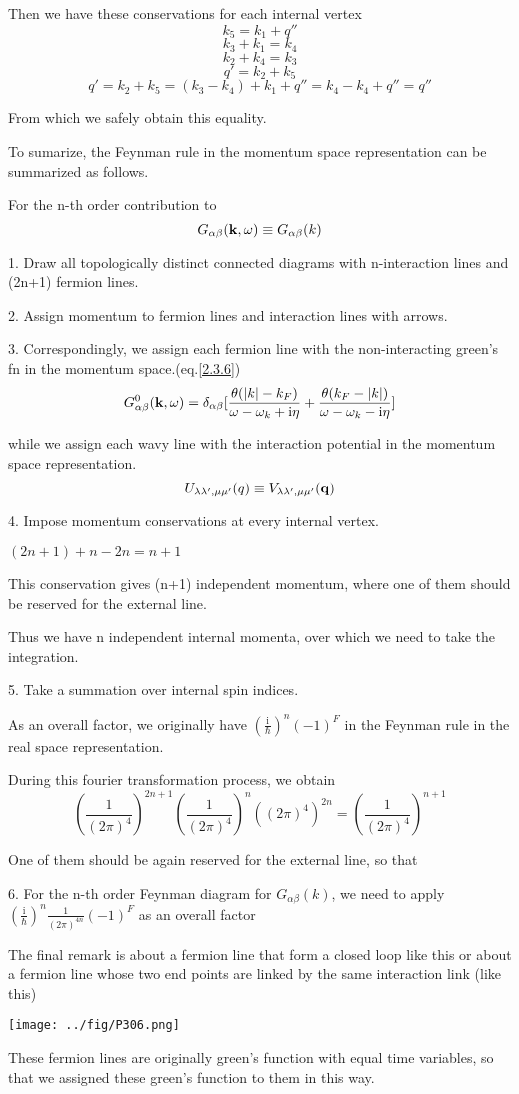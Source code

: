 Then we have these conservations for each internal vertex
$$k_5=k_1+q''$$$$k_3+k_1=k_4$$$$k_2+k_4=k_3$$$$q'=k_2+k_5$$$$q'=k_2+k_5=(k_3-k_4)+k_1+q''=k_4-k_4+q''=q''$$

From which  we safely obtain this equality.

To sumarize, the Feynman rule in the momentum space representation can be summarized as follows.

For the n-th order contribution to $$G_{\alpha\beta}({\bf k},\omega)\equiv G_{\alpha\beta}(k)$$

1. Draw all topologically distinct connected diagrams with n-interaction lines and (2n+1) fermion lines.

2. Assign momentum to fermion lines and interaction lines with arrows.

3. Correspondingly, we assign each fermion line with the non-interacting green's fn in the momentum space.(eq.\eqref{2.3.6})
$$G_{\alpha\beta}^0({\bf k},\omega)=\delta_{\alpha\beta}[\frac{\theta(|k|-k_F)}{\omega-\omega_k+\mathrm{i}\eta}+\frac{\theta(k_F-|k|)}{\omega-\omega_k-\mathrm{i}\eta}]$$

while we assign each wavy line with the interaction potential in the momentum space representation.
$$U_{\lambda\lambda',\mu\mu'}(q)\equiv V_{\lambda\lambda',\mu\mu'}({\bf q})$$

4. Impose momentum conservations at every internal vertex.

$(2n+1)+n-2n=n+1$

This conservation gives (n+1) independent momentum, where one of them should be reserved for the external line.

Thus we have n independent internal momenta, over which we need to take the integration.

5. Take a summation over internal spin indices.

As an overall factor, we originally have $(\frac{\mathrm{i}}{\hbar})^n(-1)^F$ in the Feynman rule in the real space representation.

During this fourier transformation process, we obtain
$$(\frac{1}{(2\pi)^4})^{2n+1}(\frac{1}{(2\pi)^4})^n((2\pi)^4)^{2n}=(\frac{1}{(2\pi)^4})^{n+1}$$

One of them should be again reserved for the external line, so that

6. For the n-th order Feynman diagram for $G_{\alpha\beta}(k)$, we need to apply $(\frac{\mathrm{i}}{\hbar})^n\frac{1}{(2\pi)^{4n}}(-1)^F$ as an overall factor

The final remark  is about a fermion line that form a closed loop like this or about a fermion line whose two end points are linked by the same interaction link (like this)
\begin{center}
\texttt{[image: ../fig/P306.png]}
\end{center}
These fermion lines are originally green's function with equal time variables, so that we assigned these green's function to them in this way.

